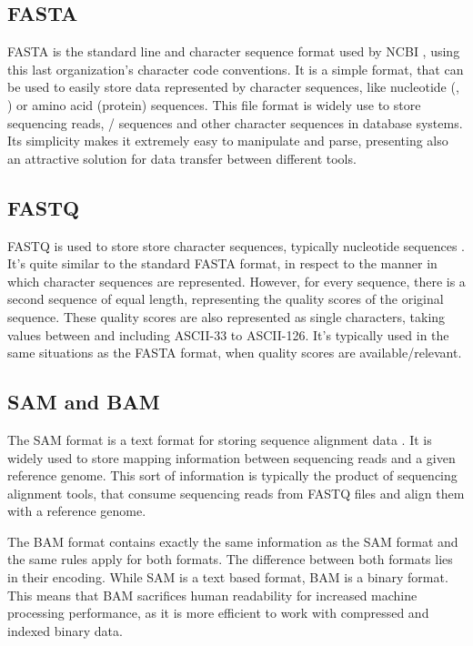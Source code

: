 \subsection{FASTA}

FASTA is the standard line and character sequence format used by NCBI
\cite{ncbi:fasta}, using this last organization's character code conventions. It
is a simple format, that can be used to easily store data represented by
character sequences, like nucleotide (\dna, \rna) or amino acid (protein)
sequences. This file format is widely use to store sequencing reads, \dna/\rna{}
sequences and other character sequences in database systems. Its simplicity
makes it extremely easy to manipulate and parse, presenting also an attractive
solution for data transfer between different tools.

\subsection{FASTQ}

FASTQ is used to store store character sequences, typically nucleotide sequences
\cite{Cock2010}. It's quite similar to the standard FASTA format, in respect to
the manner in which character sequences are represented. However, for every
sequence, there is a second sequence of equal length, representing the quality
scores of the original sequence. These quality scores are also represented as
single characters, taking values between and including ASCII-33 to ASCII-126.
It's typically used in the same situations as the FASTA format, when quality
scores are available/relevant.

\subsection{SAM and BAM}

The SAM format is a text format for storing sequence alignment data
\cite{genome:sam}. It is widely used to store mapping information between
sequencing reads and a given reference genome. This sort of information is
typically the product of sequencing alignment tools, that consume sequencing
reads from FASTQ files and align them with a reference genome.

The BAM format contains exactly the same information as the SAM format and the
same rules apply for both formats. The difference between both formats lies in
their encoding. While SAM is a text based format, BAM is a binary format. This
means that BAM sacrifices human readability for increased machine processing
performance, as it is more efficient to work with compressed and indexed binary
data.

